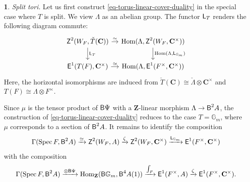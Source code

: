 \documentclass[10pt,english,reqno]{amsart}
\newcommand{\integers}{\mathbf Z}
\newcommand{\complexes}{\mathbf C}
\newcommand{\cycle}{\textnormal{\textsf{Z}}}
\newcommand{\extension}{\textnormal{\textsf{E}}}
\newcommand{\Hom}{\operatorname{Hom}}
\newcommand{\deloop}{\textnormal{\textsf{B}}}
\newcommand{\Spec}{\operatorname{Spec}}
\newcommand{\Langlands}{\textnormal{\textsf{L}}}
\theoremstyle{definition}
\numberwithin{equation}{section}
\newtheorem{untitledsubsubsection}[subsubsection]{}
\newenvironment{void}
{\begin{untitledsubsubsection}}
{\end{untitledsubsubsection}}
\begin{document}
\begin{void}\emph{Split tori.}
\label{void-torus-linear-cover-duality-split}
Let us first construct \eqref{eq-torus-linear-cover-duality} in the special case where $T$ is split. We view $\Lambda$ as an abelian group. The functor $\Langlands_T$ renders the following diagram commute:
$$
\begin{tikzcd}[column sep = 1em]
	\cycle^2(W_F, \check T(\complexes)) \ar[r, "\simeq"]\ar[d, "\Langlands_T"] & \Hom(\Lambda, \cycle^2(W_F, \complexes^{\times})) \ar[d, "{\Hom(\Lambda, \Langlands_{\mathbb G_m})}"] \\
	\extension^1(T(F), \complexes^{\times}) \ar[r, "\simeq"] & \Hom(\Lambda, \extension^1(F^{\times}, \complexes^{\times}))
\end{tikzcd}
$$
Here, the horizontal isomorphisms are induced from $\check T(\complexes) \cong \check{\Lambda} \otimes \complexes^{\times}$ and $T(F) \cong \Lambda\otimes F^{\times}$.

Since $\mu$ is the tensor product of $\deloop\Psi$ with a $\integers$-linear morphism $\Lambda \rightarrow \deloop^2 A$, the construction of \eqref{eq-torus-linear-cover-duality} reduces to the case $T = \mathbb G_m$, where $\mu$ corresponds to a section of $\deloop^2A$. It remains to identify the composition
\begin{equation}
\label{eq-multiplicative-group-linear-cover-dual}
\Gamma(\Spec F, \deloop^2 A) \xrightarrow{\simeq} \cycle^2(W_F, A) \xrightarrow{\zeta} \cycle^2(W_F, \complexes^{\times}) \xrightarrow{\Langlands_{\mathbb G_m}} \extension^1(F^{\times}, \complexes^{\times})
\end{equation}
with the composition
\begin{equation}
\label{eq-multiplicative-group-linear-cover-construction}
\Gamma(\Spec F, \deloop^2A) \xrightarrow{\otimes\deloop\Psi} \Hom_{\integers}(\deloop\mathbb G_m, \deloop^4A(1)) \xrightarrow{\int_F} \extension^1(F^{\times}, A) \xrightarrow{\zeta} \extension^1(F^{\times}, \complexes^{\times}).
\end{equation}
\end{void}

\end{document}
